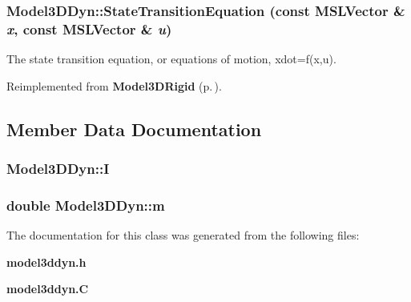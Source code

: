 \subsubsection{ Model3DDyn::State\-Transition\-Equation (const {\bf MSLVector} \& {\em x}, const {\bf MSLVector} \& {\em u})\hspace{0.3cm}{\tt  [virtual]}}\label{classModel3DDyn_a2}


The state transition equation, or equations of motion, xdot=f(x,u).



Reimplemented from {\bf Model3DRigid} {\rm (p.\,\pageref{classModel3DRigid_a3})}.

\subsection{Member Data Documentation}
\subsubsection{ Model3DDyn::I}\label{classModel3DDyn_m1}


\subsubsection{\setlength{\rightskip}{0pt plus 5cm}double Model3DDyn::m}\label{classModel3DDyn_m0}




The documentation for this class was generated from the following files:\begin{CompactItemize}
\item 
{\bf model3ddyn.h}\item 
{\bf model3ddyn.C}\end{CompactItemize}
